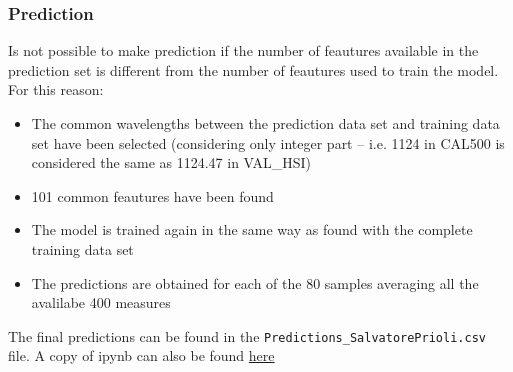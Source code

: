 \begin{frame}
    \frametitle{Prediction}
    Is not possible to make prediction if the number of feautures available in the prediction set is different from the number of feautures used to train the model. For this reason:
    \begin{itemize}
        \item The common wavelengths between the prediction data set and training data set have been selected (considering only integer part -- i.e. 1124 in CAL500 is considered the same as 1124.47 in VAL\_HSI) 
        \item 101 common feautures have been found
        \item The model is trained again in the same way as found with the complete training data set
        \item The predictions are obtained for each of the 80 samples averaging all the avalilabe 400 measures
    \end{itemize}
    The final predictions can be found in the \texttt{Predictions\_SalvatorePrioli.csv} file.
    A copy of ipynb can also be found \href{https://github.com/priolastro/data-challenge/blob/main/main.ipynb}{here}
\end{frame}